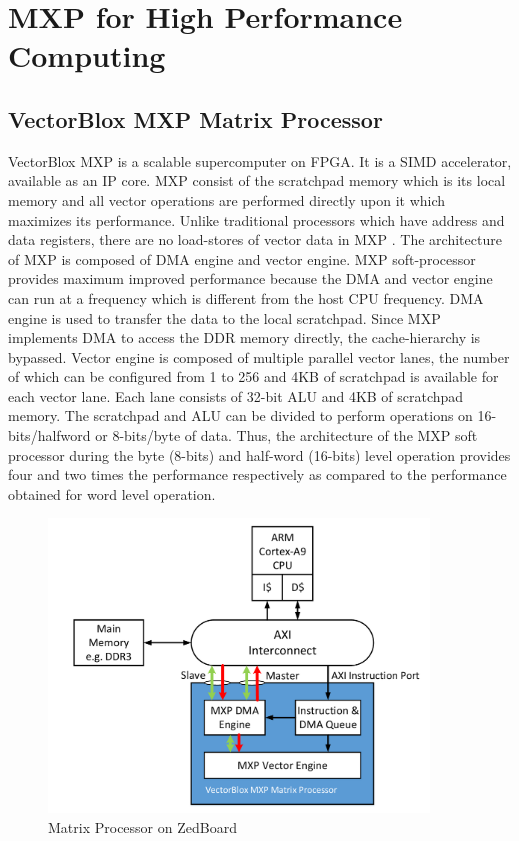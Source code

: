 \newpage
\chapter{MXP for High Performance Computing}

\section{VectorBlox MXP Matrix Processor}
VectorBlox MXP is a scalable supercomputer on FPGA. It is a SIMD accelerator, available as an IP core. MXP consist of the scratchpad memory which is its local memory and all vector operations are performed directly upon it which maximizes its performance. Unlike traditional processors which have address and data registers, there are no load-stores of vector data in MXP \cite{20}. The architecture of MXP is composed of DMA engine and vector engine. MXP soft-processor provides maximum improved performance because the DMA and vector engine can run at a frequency which is different from the host CPU frequency. DMA engine is used to transfer the data to the local scratchpad. Since MXP implements DMA to access the DDR memory directly, the cache-hierarchy is bypassed. Vector engine is composed of multiple parallel vector lanes, the number of which can be configured from 1 to 256 and 4KB of scratchpad is available for each vector lane. Each lane consists of 32-bit ALU and 4KB of scratchpad memory. The scratchpad and ALU can be divided to perform operations on 16-bits/halfword or 8-bits/byte of data. Thus, the architecture of the MXP soft processor during the byte (8-bits) and half-word (16-bits) level operation provides four and two times the performance respectively as compared to the performance obtained for word level operation. 

\begin{figure}
	\centering
	\includegraphics[width=0.9\textwidth]{images/mxp_diagram.pdf}
	\caption{Matrix Processor on ZedBoard\cite{20}}
	\label{zynq:mat}
\end{figure}

